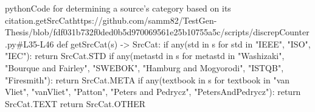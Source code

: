 \begin{codeSnippet}{python}{Code for determining a source's category based on its citation.}{getSrcCat}{https://github.com/samm82/TestGen-Thesis/blob/fdf031b732f0ded0b5d970069561e25b10755a5c/scripts/discrepCounter.py\#L35-L46}
def getSrcCat(s) -> SrcCat:
    if any(std in s for std in {"IEEE", "ISO", "IEC"}):
        return SrcCat.STD
    if any(metastd in s for metastd in
        {"Washizaki", "Bourque and Fairley", "SWEBOK",
            "Hamburg and Mogyorodi", "ISTQB", "Firesmith"}):
        return SrcCat.META
    if any(textbook in s for textbook in
        {"van Vliet", "vanVliet", "Patton", "Peters and Pedrycz",
            "PetersAndPedrycz"}):
        return SrcCat.TEXT
    return SrcCat.OTHER
\end{codeSnippet}

\mainInvalidInputTest{}

\projViolationChoice{}

\projManualViolationReq{}

\exampleCode{}

\examplePseudocode{}
